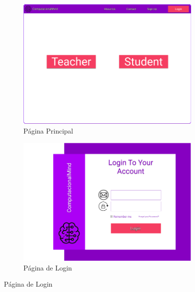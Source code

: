 \documentclass[11pt,a4paper]{report}
\begin{document}
\begin{figure}
     \centering
     \begin{subfigure}[b]{0.4\textwidth}
         \centering
         \includegraphics[width=\textwidth]{MockHome.png}
         \caption{Página Principal}
         \label{fig:MockHome}
     \end{subfigure}
     \hfill
     \begin{subfigure}[b]{0.4\textwidth}
         \centering
         \includegraphics[width=\textwidth]{MockLogin.png}
         \caption{Página de Login}
         \label{fig:MockLogin}
     \end{subfigure}
\end{figure}
\end{document}
